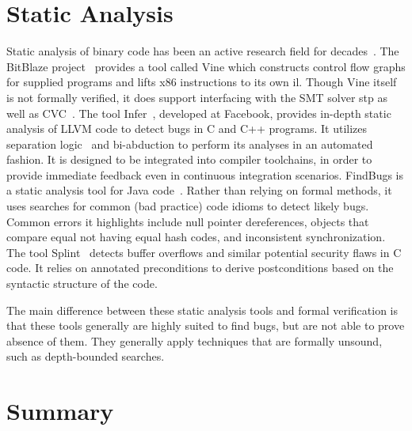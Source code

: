 \section{Static Analysis}
Static analysis of binary code has been an active research field for decades~\cite{kruegel2005automating,brumley2011bap,wang2017angr}.
The BitBlaze project~\citep{song2008bitblaze}
provides a tool called Vine which constructs control flow graphs for supplied programs and lifts x86 instructions to its own \ac{il}.
Though Vine itself is not formally verified, it does support interfacing with the SMT solver \ac{stp} as well as CVC~\citep{barrett2004cvcl,barrett2007cvc3}.
The tool Infer~\citep{calcagno2011infer}, developed at Facebook, provides in-depth static analysis of LLVM code to detect bugs in C and C++ programs.
It utilizes separation logic~\citep{reynolds2002separation} and bi-abduction to perform its analyses in an automated fashion.
It is designed to be integrated into compiler toolchains, in order to provide immediate feedback even in continuous integration scenarios.
FindBugs is a static analysis tool for Java code~\citep{hovemeyer2004findbugs}.
Rather than relying on formal methods, it uses searches for common (bad practice) code idioms to detect likely bugs.
Common errors it highlights include null pointer dereferences,
objects that compare equal not having equal hash codes,
and inconsistent synchronization.
The tool Splint~\citep{evans2002static} detects buffer overflows and similar potential security flaws in C code.
It relies on annotated preconditions to derive postconditions based on the syntactic structure of the code.

The main difference between these static analysis tools and formal verification is that these tools generally are highly suited to find bugs, but are not able to prove absence of them.
They generally apply techniques that are formally unsound, such as depth-bounded searches.

\section{Summary}
